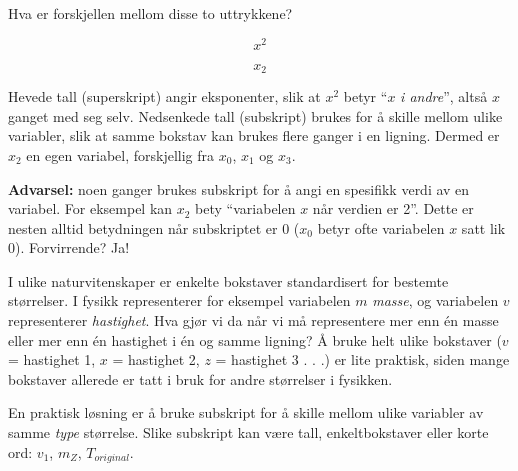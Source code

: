 

Hva er forskjellen mellom disse to uttrykkene?

$$x^2$$

$$x_2$$







Hevede tall (superskript) angir eksponenter, slik at $x^2$ betyr ``$x$ {\it i andre}'', altså $x$ ganget med seg selv. Nedsenkede tall (subskript) brukes for å skille mellom ulike variabler, slik at samme bokstav kan brukes flere ganger i en ligning. Dermed er $x_2$ en egen variabel, forskjellig fra $x_0$, $x_1$ og $x_3$.

\vskip 10pt

{\bf Advarsel:} noen ganger brukes subskript for å angi en spesifikk verdi av en variabel. For eksempel kan $x_2$ bety ``variabelen $x$ når verdien er 2''. Dette er nesten alltid betydningen når subskriptet er 0 ($x_0$ betyr ofte variabelen $x$ satt lik 0). Forvirrende? Ja!







I ulike naturvitenskaper er enkelte bokstaver standardisert for bestemte størrelser. I fysikk representerer for eksempel variabelen $m$ {\it masse}, og variabelen $v$ representerer {\it hastighet}. Hva gjør vi da når vi må representere mer enn én masse eller mer enn én hastighet i én og samme ligning? Å bruke helt ulike bokstaver ($v$ = hastighet 1, $x$ = hastighet 2, $z$ = hastighet 3 . . .) er lite praktisk, siden mange bokstaver allerede er tatt i bruk for andre størrelser i fysikken.

En praktisk løsning er å bruke subskript for å skille mellom ulike variabler av samme {\it type} størrelse. Slike subskript kan være tall, enkeltbokstaver eller korte ord: $v_1$, $m_Z$, $T_{original}$.



